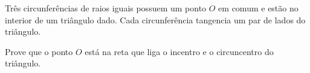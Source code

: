 Três circunferências de raios iguais possuem um ponto $O$ em comum e estão no interior de um triângulo dado. Cada circunferência tangencia um par de lados do triângulo.

Prove que o ponto $O$ está na reta que liga o incentro e o circuncentro do triângulo.
